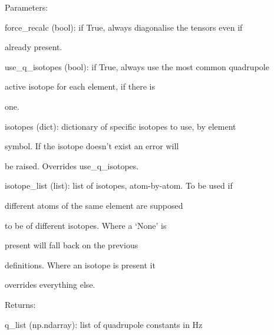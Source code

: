 \documentclass[letterpaper,10pt,english]{sphinxmanual}
\begin{document}
\begin{fulllineitems}
\begin{DUlineblock}{0em}
\item[] Parameters:
\item[]
\begin{DUlineblock}{\DUlineblockindent}
\item[] force\_recalc (bool): if True, always diagonalise the tensors even if
\item[]
\begin{DUlineblock}{\DUlineblockindent}
\item[] already present.
\end{DUlineblock}
\item[] use\_q\_isotopes (bool): if True, always use the most common quadrupole
\item[]
\begin{DUlineblock}{\DUlineblockindent}
\item[] active isotope for each element, if there is
\item[] one.
\end{DUlineblock}
\item[] isotopes (dict): dictionary of specific isotopes to use, by element
\item[]
\begin{DUlineblock}{\DUlineblockindent}
\item[] symbol. If the isotope doesn't exist an error will
\item[] be raised. Overrides use\_q\_isotopes.
\end{DUlineblock}
\item[] isotope\_list (list): list of isotopes, atom-by-atom. To be used if
\item[]
\begin{DUlineblock}{\DUlineblockindent}
\item[] different atoms of the same element are supposed
\item[] to be of different isotopes. Where a `None' is
\item[] present will fall back on the previous
\item[] definitions. Where an isotope is present it
\item[] overrides everything else.
\end{DUlineblock}
\end{DUlineblock}
\end{DUlineblock}

\begin{DUlineblock}{0em}
\item[] Returns:
\item[]
\begin{DUlineblock}{\DUlineblockindent}
\item[] q\_list (np.ndarray): list of quadrupole constants in Hz
\end{DUlineblock}
\end{DUlineblock}


\end{fulllineitems}
\end{document}
